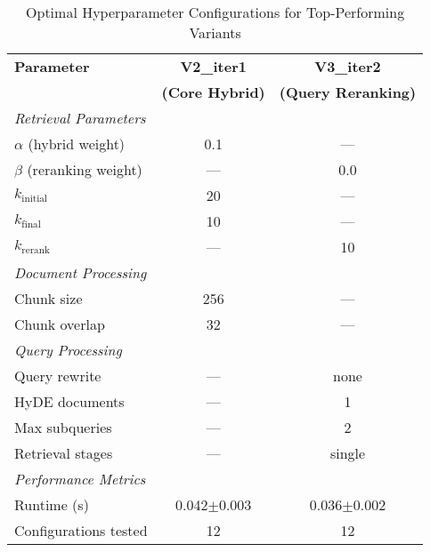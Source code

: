 \documentclass{article}
\begin{document}
\begin{table}[htbp]
\centering
\caption{Optimal Hyperparameter Configurations for Top-Performing Variants}
\label{tab:hyperparameters}
\begin{tabular}{@{}lcc@{}}
\toprule
\textbf{Parameter} & \textbf{V2\_iter1} & \textbf{V3\_iter2} \\
 & \textbf{(Core Hybrid)} & \textbf{(Query Reranking)} \\
\midrule
\multicolumn{3}{l}{\textit{Retrieval Parameters}} \\
$\alpha$ (hybrid weight) & 0.1 & --- \\
$\beta$ (reranking weight) & --- & 0.0 \\
$k_{\text{initial}}$ & 20 & --- \\
$k_{\text{final}}$ & 10 & --- \\
$k_{\text{rerank}}$ & --- & 10 \\
\midrule
\multicolumn{3}{l}{\textit{Document Processing}} \\
Chunk size & 256 & --- \\
Chunk overlap & 32 & --- \\
\midrule
\multicolumn{3}{l}{\textit{Query Processing}} \\
Query rewrite & --- & none \\
HyDE documents & --- & 1 \\
Max subqueries & --- & 2 \\
Retrieval stages & --- & single \\
\midrule
\multicolumn{3}{l}{\textit{Performance Metrics}} \\
Runtime (s) & 0.042$\pm$0.003 & 0.036$\pm$0.002 \\
Configurations tested & 12 & 12 \\
\bottomrule
\end{tabular}
\end{table}
\end{document}
